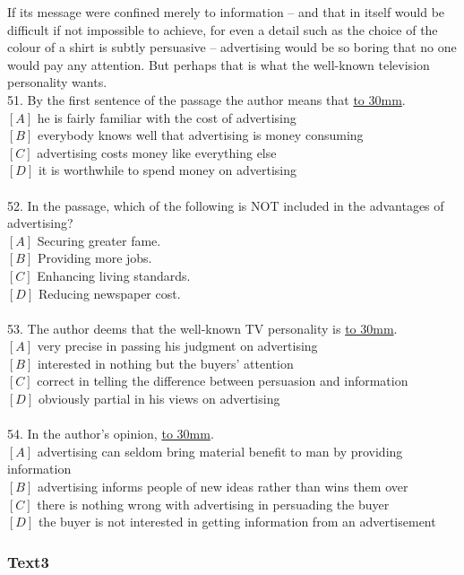 \documentclass[a4paper]{article}
\begin{document}
\par
If its message were confined merely to information -- and that in itself would be difficult if not impossible to achieve, for even a detail such as the choice of the colour of a shirt is subtly persuasive -- advertising would be so boring that no one would pay any attention. But perhaps that is what the well-known television personality wants.
\\51.	By the first sentence of the passage the author means that \underline{\hbox to 30mm{}}.\\$[A]$ he is fairly familiar with the cost of advertising\\$[B]$ everybody knows well that advertising is money consuming\\$[C]$ advertising costs money like everything else\\$[D]$ it is worthwhile to spend money on advertising\\\\52.	In the passage, which of the following is NOT included in the advantages of advertising?\\$[A]$ Securing greater fame.\\$[B]$ Providing more jobs.\\$[C]$ Enhancing living standards.\\$[D]$ Reducing newspaper cost.\\\\53.	The author deems that the well-known TV personality is \underline{\hbox to 30mm{}}.\\$[A]$ very precise in passing his judgment on advertising\\$[B]$ interested in nothing but the buyers’ attention\\$[C]$ correct in telling the difference between persuasion and information\\$[D]$ obviously partial in his views on advertising\\\\54.	In the author’s opinion, \underline{\hbox to 30mm{}}.\\$[A]$ advertising can seldom bring material benefit to man by providing information\\$[B]$ advertising informs people of new ideas rather than wins them over\\$[C]$ there is nothing wrong with advertising in persuading the buyer\\$[D]$ the buyer is not interested in getting information from an advertisement\\\subsubsection{Text3}
\end{document}
